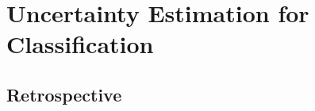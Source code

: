 \chapter{Uncertainty Estimation for Classification}
\label{chap:iid_classification}







\section*{Retrospective}
%
